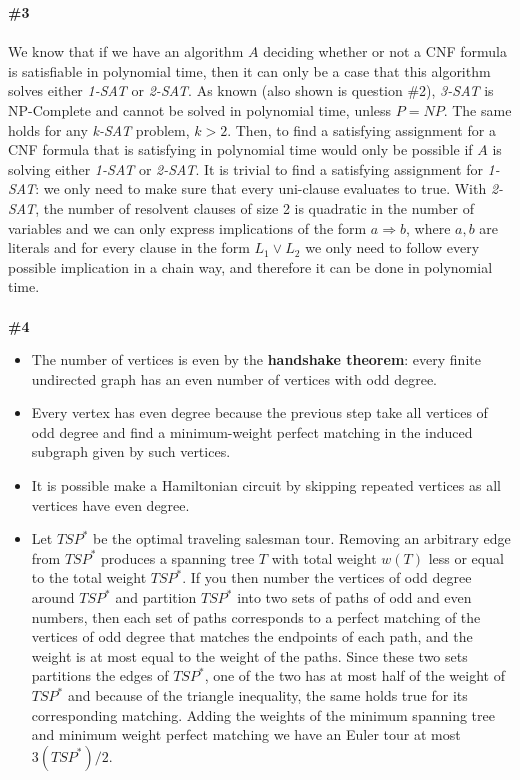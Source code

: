 \documentclass{article}
\begin{document}
\textbf{\#3}
\\
\\
We know that if we have an algorithm $A$ deciding whether or not a CNF formula is satisfiable in polynomial time, then it can only be a case that this algorithm solves either \textit{1-SAT} or \textit{2-SAT}. As known (also shown is question \#2), \textit{3-SAT} is NP-Complete and cannot be solved in polynomial time, unless $P=NP$. The same holds for any \textit{k-SAT} problem, $k > 2$. Then, to find a satisfying assignment for a CNF formula that is satisfying in polynomial time would only be possible if $A$ is solving either \textit{1-SAT} or \textit{2-SAT}. It is trivial to find a satisfying assignment for \textit{1-SAT}: we only need to make sure that every uni-clause evaluates to true. With \textit{2-SAT}, the number of resolvent clauses of size 2 is quadratic in the number of variables and we can only express implications of the form $a \Rightarrow b $, where $a, b$ are literals and for every clause in the form $L_1 \lor L_2$ we only need to follow every possible implication in a chain way, and therefore it can be done in polynomial time.
\\
\\
\textbf{\#4}
\begin{itemize}
\item The number of vertices is even by the \textbf{handshake theorem}: every finite undirected graph has an even number of vertices with odd degree.
\item Every vertex has even degree because the previous step take all vertices of odd degree and find a minimum-weight perfect matching in the induced subgraph given by such vertices.
\item It is possible make a Hamiltonian circuit by skipping repeated vertices as all vertices have even degree.
\item Let $TSP^*$ be the optimal traveling salesman tour. Removing an arbitrary edge from $TSP^*$ produces a spanning tree $T$ with total weight $w(T)$ less or equal to the total weight $TSP^*$. If you then number the vertices of odd degree around $TSP^*$ and partition $TSP^*$ into two sets of paths of odd and even numbers, then each set of paths corresponds to a perfect matching of the vertices of odd degree that matches the endpoints of each path, and the weight is at most equal to the weight of the paths. Since these two sets partitions the edges of $TSP^*$, one of the two has at most half of the weight of $TSP^*$ and because of the triangle inequality, the same holds true for its corresponding matching. Adding the weights of the minimum spanning tree and minimum weight perfect matching we have an Euler tour at most $3(TSP^*)/2$.
\\
\end{itemize}
\end{document}
